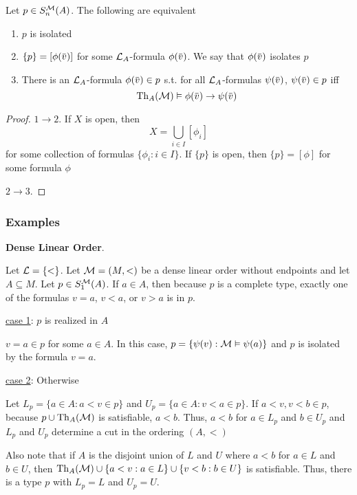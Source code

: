 \documentclass[11pt]{article}
\begin{document}
\begin{proposition}[]
Let \(p\in S_n^{\mathcal{M}}(A)\). The following are equivalent
\begin{enumerate}
\item \(p\) is isolated
\item \(\{p\}=[\phi(\barv)]\) for some \(\mathcal{L}_A\)-formula \(\phi(\barv)\). We say that \(\phi(\barv)\) isolates \(p\)
\item There is an \(\mathcal{L}_A\)-formula \(\phi(\barv)\in p\) s.t. for
all \(\mathcal{L}_A\)-formulas \(\psi(\barv)\), \(\psi(\barv)\in p\) iff
\begin{equation*}
\Th_A(\calm)\vDash\phi(\barv)\to\psi(\barv)
\end{equation*}
\end{enumerate}
\end{proposition}

\begin{proof}
\(1\to 2\). If \(X\) is open, then
\begin{equation*}
   X=\bigcup_{i\in I}[\phi_i]
\end{equation*}
for some collection of formulas \(\{\phi_i:i\in I\}\). If \(\{p\}\) is open, then \(\{p\}=[\phi]\) for some
formula \(\phi\)

\(2\to 3\).
\end{proof}

\subsubsection{Examples}
\label{sec:orgd2e0d30}
\textbf{Dense Linear Order}.

Let \(\mathcal{L}=\{<\}\). Let \(\mathcal{M}=(M,<)\) be a dense linear order without endpoints and let \(A\subseteq M\).
Let \(p\in S_1^{\mathcal{M}}(A)\). If \(a\in A\), then because \(p\) is a complete type, exactly one of the
formulas \(v=a\), \(v<a\), or \(v>a\) is in \(p\).

\uline{case 1}: \(p\) is realized in \(A\)

\(v=a\in p\) for some \(a\in A\). In this case, \(p=\{\psi(v):\mathcal{M}\vDash\psi(a)\}\) and \(p\) is isolated by the
formula \(v=a\).

\uline{case 2}: Otherwise

Let \(L_p=\{a\in A:a<v\in p\}\) and \(U_p=\{a\in A:v<a\in p\}\). If \(a<v,v<b\in p\), because \(p\cup\operatorname{Th}_A(\mathcal{M})\)
is satisfiable, \(a<b\). Thus, \(a<b\) for \(a\in L_p\) and \(b\in U_p\) and \(L_p\) and \(U_p\)
determine a cut in the ordering \((A,<)\)

Also note that if \(A\) is the disjoint union of \(L\) and \(U\) where \(a<b\) for \(a\in L\)
and \(b\in U\), then \(\operatorname{Th}_A(\mathcal{M})\cup\{a<v:a\in L\}\cup\{v<b:b\in U\}\) is satisfiable. Thus, there is a
type \(p\) with \(L_p=L\) and \(U_p=U\).
\end{document}
